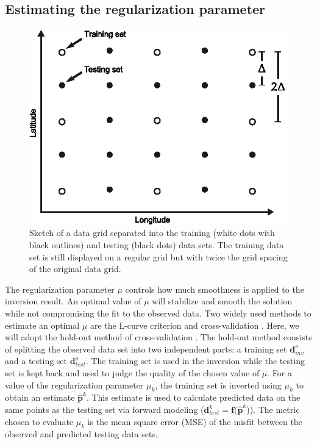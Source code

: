 \documentclass[extra]{gji}
\begin{document}
\subsection{Estimating the regularization parameter}

\begin{figure}
    \centering
    \includegraphics{figures/cv-grid-separation}
    \caption{Sketch of a data grid separated into
        the training (white dots with black outlines)
        and testing (black dots) data sets.
        The training data set is still displayed on a regular grid
        but with twice the grid spacing
        of the original data grid.}
    \label{fig:grid_separation}
\end{figure}

The regularization parameter $\mu$ controls how much smoothness is applied to
the inversion result.
An optimal value of $\mu$ will stabilize and smooth the solution while not
compromising the fit to the observed data.
Two widely used methods to estimate an optimal $\mu$ are
the L-curve criterion and cross-validation \citep{hansen1992}.
Here, we will adopt the hold-out method of cross-validation \citep{kim2009}.
The hold-out method consists of splitting the observed data set into two
independent parts:
a training set $\mathbf{d}^o_{inv}$
and a testing set $\mathbf{d}^o_{test}$.
The training set is used in the inversion
while the testing set is kept back
and used to judge the quality of the chosen value of $\mu$.
For a value of the regularization parameter $\mu_k$,
the training set is inverted using $\mu_k$
to obtain an estimate $\mathbf{\hat{p}}^k$.
This estimate is used to calculate predicted data
on the same points as the testing set
via forward modeling
($\mathbf{d}_{test}^k = \mathbf{f}(\mathbf{\hat{p}}^k$)).
The metric chosen to evaluate $\mu_k$ is
the mean square error (MSE) of the misfit
between the observed and predicted testing data sets,
\end{document}
